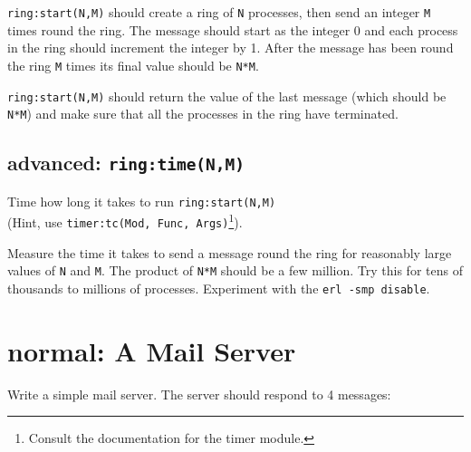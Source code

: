 \documentclass[12pt]{hitec}
\begin{document}
\verb+ring:start(N,M)+ should create a ring of \verb+N+ processes,
then send an integer \verb+M+ times round the ring. The message should
start as the integer 0 and each process in the ring should increment
the integer by 1.  After the message has been round the ring \verb+M+
times its final value should be \verb+N*M+. 

\verb+ring:start(N,M)+ should return the value of the last message
(which should be \verb+N*M+) and make sure that all the processes in
the ring have terminated.

\subsection{advanced: \texttt{ring:time(N,M)}}

Time how long it takes to run \verb+ring:start(N,M)+\\
(Hint, use
\verb+timer:tc(Mod, Func, Args)+\footnote{Consult the documentation for
  the timer module.}).

Measure the time it takes to send a message round the ring for
reasonably large values of \verb+N+ and \verb+M+. The product
of \verb+N*M+ should be a few million. Try this for tens of thousands to
millions of processes. Experiment with the \verb+erl -smp disable+.

\section{normal: A Mail Server}

Write a simple mail server. The server should respond to 4 messages:
\end{document}

